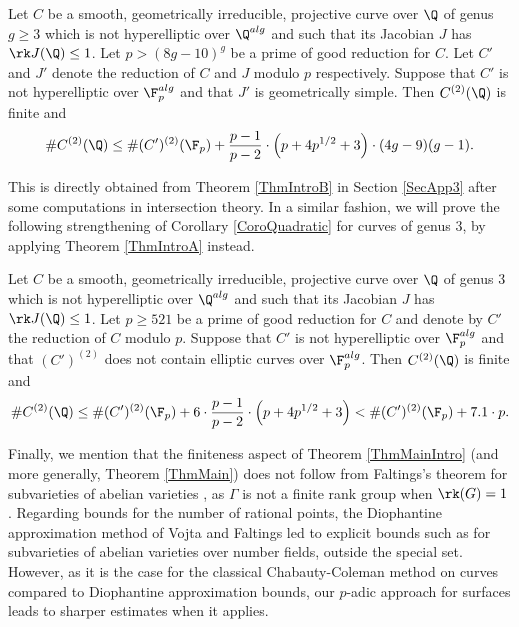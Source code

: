 \begin{corollary}
\notready\label{CoroQuadratic} Let $C$ be a smooth, geometrically irreducible, projective curve over $\Q$ of genus $g\ge 3$ which is not hyperelliptic over $\Q^{alg}$ and such that its Jacobian $J$ has $\rk J(\Q)\le 1$.  Let  $p>(8g-10)^g$ be a prime of good reduction for $C$. Let $C'$ and $J'$ denote the reduction of $C$ and $J$ modulo $p$ respectively. Suppose that $C'$ is not hyperelliptic over $\F_p^{alg}$ and that $J'$ is geometrically simple. Then  $C^{(2)}(\Q)$ is finite and
$$
\# C^{(2)}(\Q)\le \# (C')^{(2)}(\F_p) +  \frac{p-1}{p-2}\cdot \left(p+4p^{1/2} + 3\right)\cdot (4g-9)(g-1).
$$
\end{corollary}

This is directly obtained from Theorem \ref{ThmIntroB} in Section \ref{SecApp3} after some computations in intersection theory. In a similar fashion, we will prove the following strengthening of Corollary \ref{CoroQuadratic} for curves of genus $3$, by applying Theorem \ref{ThmIntroA} instead.

\begin{corollary}
\notready\label{CoroQuadratic3} Let $C$ be a smooth, geometrically irreducible, projective curve over $\Q$ of genus $3$ which is not hyperelliptic over $\Q^{alg}$ and such that its Jacobian $J$ has $\rk J(\Q)\le 1$.  Let  $p\ge 521$ be a prime of good reduction for $C$ and denote by $C'$ the reduction of $C$ modulo $p$. Suppose that $C'$ is not hyperelliptic over $\F_p^{alg}$ and that $(C')^{(2)}$ does not contain elliptic curves over $\F_p^{alg}$. Then  $C^{(2)}(\Q)$  is finite and
$$
\# C^{(2)}(\Q)\le \# (C')^{(2)}(\F_p) +  6\cdot \frac{p-1}{p-2}\cdot \left(p+4p^{1/2} + 3\right) <  \# (C')^{(2)}(\F_p) + 7.1\cdot p.
$$
\end{corollary}


Finally, we mention that the finiteness aspect of Theorem \ref{ThmMainIntro} (and more generally, Theorem \ref{ThmMain}) does not follow from Faltings's theorem for subvarieties of abelian varieties \cite{Faltings2}, as $\Gamma$ is not a finite rank group when $\rk(G)=1$.  Regarding bounds for the number of rational points, the Diophantine approximation method of Vojta \cite{VojtaCompact} and Faltings \cite{Faltings2,Faltings3} led to explicit bounds such as \cite{Remond1,Remond2} for subvarieties of abelian varieties over number fields, outside the special set. However, as it is the case for the classical Chabauty-Coleman method on curves compared to Diophantine approximation bounds, our $p$-adic approach for surfaces leads to sharper estimates when it applies.


